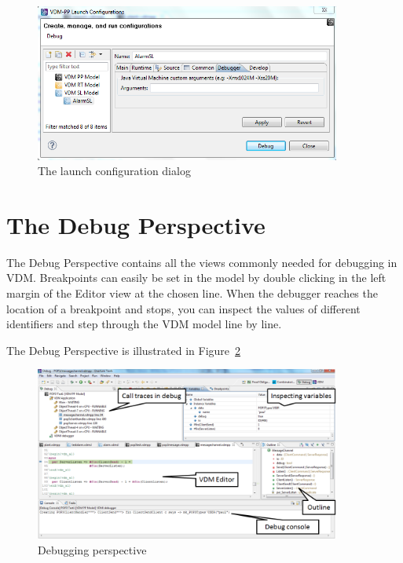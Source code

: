 \documentclass{overturerepchap}
\begin{document}
\begin{figure}[htp]
\begin{center}
  \includegraphics[width=380px]{screenDumps/launchconfigSpecialoptions}
  \caption{The launch configuration dialog}
  \label{fig:userguide:launchconfigSpecialoptions}
\end{center}
\end{figure}

\section{The Debug Perspective}

The Debug Perspective contains all the views
commonly needed for debugging in VDM. Breakpoints can easily be set in the
model by double clicking in the left margin of the Editor view at the chosen
line. When the debugger reaches the location of a breakpoint and stops, you can
inspect the values of different identifiers and step through the VDM model 
line by line.
 
The Debug Perspective is illustrated in Figure~\ref{fig:userguide:DebuggingVDM}

\begin{figure}[htp]
\begin{center}
  \includegraphics[width=380px]{figures/DebuggingVDM}
  \caption[Debugging perspective]{Debugging perspective}
  \label{fig:userguide:DebuggingVDM}
\end{center}
\end{figure}
\end{document}
